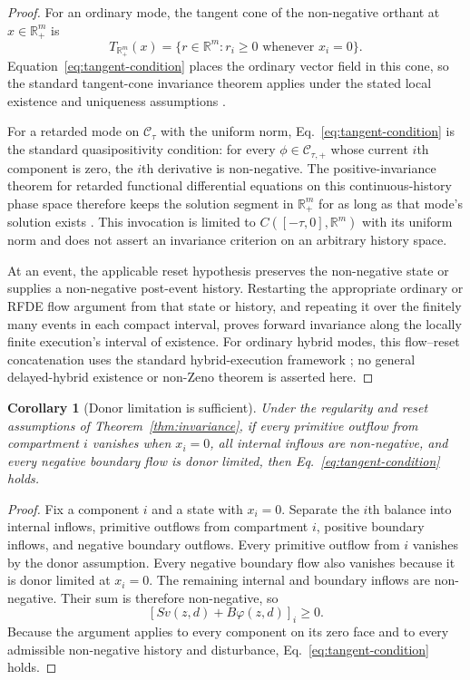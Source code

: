 \documentclass[11pt]{article}
\newtheorem{corollary}{Corollary}
\theoremstyle{definition}
\begin{document}
\begin{proof}
For an ordinary mode, the tangent cone of the non-negative orthant at
$x\in\mathbb R_+^m$ is
\[
T_{\mathbb R_+^m}(x)=\{r\in\mathbb R^m:r_i\ge0\text{ whenever }x_i=0\}.
\]
Equation~\eqref{eq:tangent-condition} places the ordinary vector field in
this cone, so the standard tangent-cone invariance theorem applies under the
stated local existence and uniqueness assumptions \cite{blanchini1999}.

For a retarded mode on $\mathcal C_\tau$ with the uniform norm,
Eq.~\eqref{eq:tangent-condition} is the standard quasipositivity condition:
for every $\phi\in\mathcal C_{\tau,+}$ whose current $i$th component is zero,
the $i$th derivative is non-negative. The positive-invariance theorem for
retarded functional differential equations on this continuous-history
phase space therefore keeps the solution segment in $\mathbb R_+^m$ for as
long as that mode's solution exists \cite{hale1993}. This invocation is
limited to $C([ -\tau,0],\mathbb R^m)$ with its uniform norm and does not
assert an invariance criterion on an arbitrary history space.

At an event, the applicable reset hypothesis preserves the non-negative
state or supplies a non-negative post-event history. Restarting the
appropriate ordinary or RFDE flow argument from that state or history, and
repeating it over the finitely many events in each compact interval, proves
forward invariance along the locally finite execution's interval of
existence. For ordinary hybrid modes, this flow--reset concatenation uses the
standard hybrid-execution framework \cite{goebel2012}; no general
delayed-hybrid existence or non-Zeno theorem is asserted here.
\end{proof}

\begin{corollary}[Donor limitation is sufficient]
Under the regularity and reset assumptions of Theorem~\ref{thm:invariance}, if every primitive outflow from compartment $i$ vanishes when $x_i=0$, all internal inflows are non-negative, and every negative boundary flow is donor limited, then Eq.~\eqref{eq:tangent-condition} holds.
\end{corollary}

\begin{proof}
Fix a component $i$ and a state with $x_i=0$. Separate the $i$th balance into internal inflows, primitive outflows from compartment $i$, positive boundary inflows, and negative boundary outflows. Every primitive outflow from $i$ vanishes by the donor assumption. Every negative boundary flow also vanishes because it is donor limited at $x_i=0$. The remaining internal and boundary inflows are non-negative. Their sum is therefore non-negative, so
\[
[Sv(z,d)+B\varphi(z,d)]_i\ge0.
\]
Because the argument applies to every component on its zero face and to every admissible non-negative history and disturbance, Eq.~\eqref{eq:tangent-condition} holds.
\end{proof}
\end{document}
